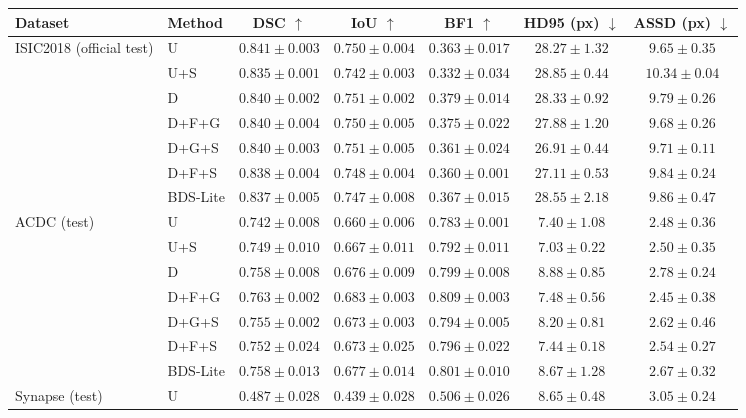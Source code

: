 \begin{tabular}{llccccc}
\toprule
Dataset & Method & DSC $\uparrow$ & IoU $\uparrow$ & BF1 $\uparrow$ & HD95 (px) $\downarrow$ & ASSD (px) $\downarrow$ \\
\midrule
ISIC2018 (official test) & U & $0.841 \pm 0.003$ & $0.750 \pm 0.004$ & $0.363 \pm 0.017$ & $28.27 \pm 1.32$ & $9.65 \pm 0.35$ \\
 & U+S & $0.835 \pm 0.001$ & $0.742 \pm 0.003$ & $0.332 \pm 0.034$ & $28.85 \pm 0.44$ & $10.34 \pm 0.04$ \\
 & D & $0.840 \pm 0.002$ & $0.751 \pm 0.002$ & $0.379 \pm 0.014$ & $28.33 \pm 0.92$ & $9.79 \pm 0.26$ \\
 & D+F+G & $0.840 \pm 0.004$ & $0.750 \pm 0.005$ & $0.375 \pm 0.022$ & $27.88 \pm 1.20$ & $9.68 \pm 0.26$ \\
 & D+G+S & $0.840 \pm 0.003$ & $0.751 \pm 0.005$ & $0.361 \pm 0.024$ & $26.91 \pm 0.44$ & $9.71 \pm 0.11$ \\
 & D+F+S & $0.838 \pm 0.004$ & $0.748 \pm 0.004$ & $0.360 \pm 0.001$ & $27.11 \pm 0.53$ & $9.84 \pm 0.24$ \\
 & BDS-Lite & $0.837 \pm 0.005$ & $0.747 \pm 0.008$ & $0.367 \pm 0.015$ & $28.55 \pm 2.18$ & $9.86 \pm 0.47$ \\
\midrule
ACDC (test) & U & $0.742 \pm 0.008$ & $0.660 \pm 0.006$ & $0.783 \pm 0.001$ & $7.40 \pm 1.08$ & $2.48 \pm 0.36$ \\
 & U+S & $0.749 \pm 0.010$ & $0.667 \pm 0.011$ & $0.792 \pm 0.011$ & $7.03 \pm 0.22$ & $2.50 \pm 0.35$ \\
 & D & $0.758 \pm 0.008$ & $0.676 \pm 0.009$ & $0.799 \pm 0.008$ & $8.88 \pm 0.85$ & $2.78 \pm 0.24$ \\
 & D+F+G & $0.763 \pm 0.002$ & $0.683 \pm 0.003$ & $0.809 \pm 0.003$ & $7.48 \pm 0.56$ & $2.45 \pm 0.38$ \\
 & D+G+S & $0.755 \pm 0.002$ & $0.673 \pm 0.003$ & $0.794 \pm 0.005$ & $8.20 \pm 0.81$ & $2.62 \pm 0.46$ \\
 & D+F+S & $0.752 \pm 0.024$ & $0.673 \pm 0.025$ & $0.796 \pm 0.022$ & $7.44 \pm 0.18$ & $2.54 \pm 0.27$ \\
 & BDS-Lite & $0.758 \pm 0.013$ & $0.677 \pm 0.014$ & $0.801 \pm 0.010$ & $8.67 \pm 1.28$ & $2.67 \pm 0.32$ \\
\midrule
Synapse (test) & U & $0.487 \pm 0.028$ & $0.439 \pm 0.028$ & $0.506 \pm 0.026$ & $8.65 \pm 0.48$ & $3.05 \pm 0.24$ \\

\end{tabular}
